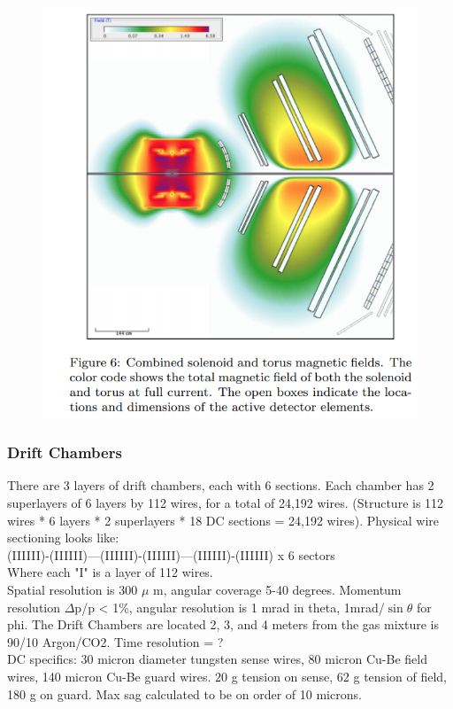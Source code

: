 			 \begin{figure}[H]
    			\centering
    			\includegraphics[width=12cm]{Chapters/Ch2-Experiment/clas-12-exp/clas-detectors/fd/pics/torus.png}
			\end{figure}
                        

        
        \subsubsection{Drift Chambers}
            There are 3 layers of drift chambers, each with 6 sections. Each chamber has 2 superlayers of 6 layers by 112 wires, for a total of 24,192 wires. (Structure is 112 wires * 6 layers * 2 superlayers * 18 DC sections = 24,192 wires). Physical wire sectioning looks like:\\
            (IIIIII)-(IIIIII)---(IIIIII)-(IIIIII)---(IIIIII)-(IIIIII) x 6 sectors\\
            Where each "I" is a layer of 112 wires.\\
            Spatial resolution is 300 $\mu$ m, angular coverage 5-40 degrees. Momentum resolution $\Delta$p/p < 1\%, angular resolution is 1 mrad in theta, 1mrad/$\sin{\theta}$ for phi. The Drift Chambers are located 2, 3, and 4 meters from the gas mixture is 90/10 Argon/CO2. Time resolution = ?\\
            DC specifics: 30 micron diameter tungsten sense wires, 80 micron Cu-Be field wires, 140 micron Cu-Be guard wires. 20 g tension on sense, 62 g tension of field, 180 g on guard. Max sag calculated to be on order of 10 microns.
            
